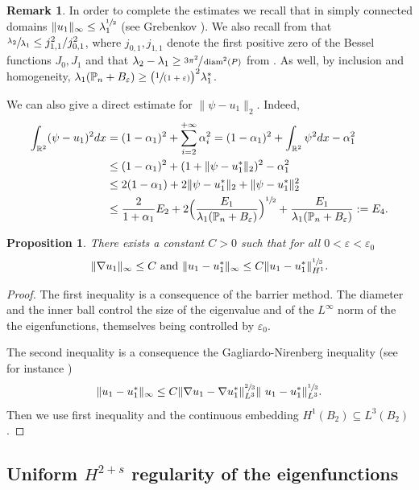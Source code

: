 \documentclass[11pt]{article}
\numberwithin{equation}{section}\newtheorem*{jepEnonce}{\jepEnonceTitle}\newenvironment{enonce*}[1]{\def\jepEnonceTitle{#1}\jepEnonce}{\endjepEnonce}\newtheorem*{conj*}{Conjecture}
\newcommand{\spfrac}[2]{\sfrac{#1}{(#2)}}
\theoremstyle{plain}
\newtheorem{propo}[thm]{Proposition}
\theoremstyle{definition}
\newtheorem{rem}[thm]{Remark}
\newcommand{\diam}{\operatorname{diam}}
\let\Bbb\mathbb
\newcommand{\vps}{\varepsilon}
\newcommand{\lb}{\lambda}
\newcommand{\sq}{\subseteq}
\let\jepOriginalSfrac\sfrac
\renewcommand{\sfrac}[2]{{\jepOriginalSfrac{#1}{#2}}}
\begin{document}
\begin{rem}
In order to complete the estimates we recall that in simply connected domains $\|u_1\|_\infty \le \lb_1^{\sfrac 12}$ (see Grebenkov \cite[For.\,(6.22)]{GrNg13}). We also recall from \cite{AsBe92} that $\sfrac{\lb_2 }{ \lb _1} \le j_{1,1}^2/j_{0,1}^2$, where $j_{0,1}, j_{1,1}$ denote the first positive zero of the Bessel functions $J_0, J_1$ and that $\lb_2-\lb_1\ge \sfrac{3\pi^2}{\diam^2 (P)}$ from \cite{AnCl11}.
As well, by inclusion and homogeneity, $\lb_1(\Bbb{P}_n+ B_\vps) \ge \big (\spfrac{1}{1+\vps} \big)^2 \lb_1^*$.

We can also give a direct estimate for $\|\psi -u_1 \|_2$. Indeed,
\begin{align*}
\int_{\Bbb{R}^2} (\psi -u_1)^2 dx &= (1-\alpha_1)^2+ \sum_{i=2}^{+\infty} \alpha_i^2= (1-\alpha_1)^2+ \int_{\Bbb{R}^2} \psi^2 dx -\alpha_1^2
\\
&\le (1-\alpha_1)^2+(1+ \|\psi -u_1^*\|_2)^2 -\alpha_1^2
\\
&\le 2(1-\alpha_1)+ 2 \|\psi -u_1^*\|_2 + \|\psi -u_1^*\|_2^2
\\
&\le \frac{2}{1+\alpha_1} E_2+ 2\Bigl(\frac{E_1}{\lb_1(\Bbb{P}_n+ B_\vps)}\Bigr)^{\sfrac12}+\frac{E_1}{\lb_1(\Bbb{P}_n+ B_\vps)}:=E_4.
\end{align*}
\end{rem}

\begin{propo}\label{bobu16}
There exists a constant $C>0$ such that for all $0<\vps<\vps _0$
\[
\|\nabla u_1\|_\infty \le C \text{ and }\|u_1-u_1^*\|_\infty \le C \|u_1-u_1^*\|_{H^1}^{\sfrac13}.
\]
\end{propo}
\begin{proof}
The first inequality is a consequence of the barrier method. The diameter and the inner ball control the size of the eigenvalue and of the $L^\infty$ norm of the the eigenfunctions, themselves being controlled by $\vps_0$.

The second inequality is a consequence the Gagliardo-Nirenberg inequality (see for instance \cite{Po20})
\[
\|u_1-u_1^*\|_\infty \le C \|\nabla u_1-\nabla u_1^*\|_{L^3}^{\sfrac 23} \|\ u_1-u_1^*\|_{L^3}^{\sfrac13}.
\]
Then we use first inequality and the continuous embedding $H^1(B_2) \sq L^3(B_2)$.
\end{proof}
\subsection{Uniform $H^{2+s}$ regularity of the eigenfunctions}
\end{document}
